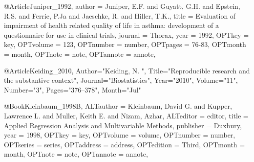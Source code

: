 {{{@Article{Juniper_1992,
author = {Juniper, E.F. and Guyatt, G.H. and Epstein, R.S. and Ferrie, P.Ja and Jaeschke, R. and Hiller, T.K.},
title = {Evaluation of impairment of health related quality of life in asthma: development of a questionnaire for use in clinical trials},
journal = {Thorax},
year = {1992},
OPTkey = {key},
OPTvolume = {123},
OPTnumber = {number},
OPTpages = {76-83},
OPTmonth = {month},
OPTnote = {note},
OPTannote = {annote},
}


@Article{Keiding_2010,
   Author="Keiding, N. ",
   Title="{{R}eproducible research and the substantive context}",
   Journal="Biostatistics",
   Year="2010",
   Volume="11",
   Number="3",
   Pages="376--378",
   Month="Jul"
}

@Book{Kleinbaum_1998B,
ALTauthor = {Kleinbaum, David G. and Kupper, Lawrence L. and
Muller, Keith E. and Nizam, Azhar},
ALTeditor = {editor},
title = {Applied Regression Analysis and Multivariable 
Methods},
publisher = {Duxbury},
year = {1998},
OPTkey = {key},
OPTvolume = {volume},
OPTnumber = {number},
OPTseries = {series},
OPTaddress = {address},
OPTedition = {Third},
OPTmonth = {month},
OPTnote = {note},
OPTannote = {annote},
}


}}}
